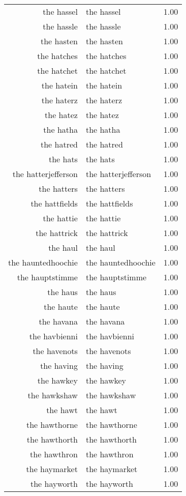 \begin{table}[ht]
\begin{tabular}{rlr}
  the hassel & the hassel & 1.00 \\ 
  the hassle & the hassle & 1.00 \\ 
  the hasten & the hasten & 1.00 \\ 
  the hatches & the hatches & 1.00 \\ 
  the hatchet & the hatchet & 1.00 \\ 
  the hatein & the hatein & 1.00 \\ 
  the haterz & the haterz & 1.00 \\ 
  the hatez & the hatez & 1.00 \\ 
  the hatha & the hatha & 1.00 \\ 
  the hatred & the hatred & 1.00 \\ 
  the hats & the hats & 1.00 \\ 
  the hatterjefferson & the hatterjefferson & 1.00 \\ 
  the hatters & the hatters & 1.00 \\ 
  the hattfields & the hattfields & 1.00 \\ 
  the hattie & the hattie & 1.00 \\ 
  the hattrick & the hattrick & 1.00 \\ 
  the haul & the haul & 1.00 \\ 
  the hauntedhoochie & the hauntedhoochie & 1.00 \\ 
  the hauptstimme & the hauptstimme & 1.00 \\ 
  the haus & the haus & 1.00 \\ 
  the haute & the haute & 1.00 \\ 
  the havana & the havana & 1.00 \\ 
  the havbienni & the havbienni & 1.00 \\ 
  the havenots & the havenots & 1.00 \\ 
  the having & the having & 1.00 \\ 
  the hawkey & the hawkey & 1.00 \\ 
  the hawkshaw & the hawkshaw & 1.00 \\ 
  the hawt & the hawt & 1.00 \\ 
  the hawthorne & the hawthorne & 1.00 \\ 
  the hawthorth & the hawthorth & 1.00 \\ 
  the hawthron & the hawthron & 1.00 \\ 
  the haymarket & the haymarket & 1.00 \\ 
  the hayworth & the hayworth & 1.00 \\ 

\end{tabular}
\end{table}

